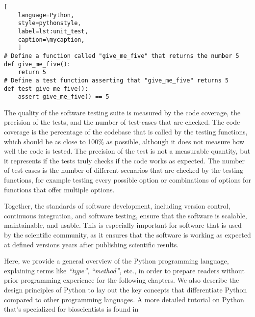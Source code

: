 \def\mycaption{ Example of an arbitrary Python function and its respective unit
    test function. The first function simply returns the number 5. The second
    function tests if the first function indeed returns the number 5. The test
    function is named with the prefix ``\texttt{test\_}'' and is placed in a
    file that ends with the suffix ``\texttt{\_test.py}''. Testing frameworks
    such as \texttt{pytest} scan the repository for files that end with
    ``\texttt{\_test.py}'' and execute the functions that start with
    ``\texttt{test\_}''. Note that code after ``\texttt{\#}'' is considered a
    comment and won't be executed.}
\begin{lstlisting}[
    language=Python, 
    style=pythonstyle,
    label=lst:unit_test, 
    caption=\mycaption,
    ]
# Define a function called "give_me_five" that returns the number 5
def give_me_five():
    return 5
# Define a test function asserting that "give_me_five" returns 5
def test_give_me_five():
    assert give_me_five() == 5 
\end{lstlisting}


The quality of the software testing suite is measured by the code coverage, the
precision of the tests, and the number of test-cases that are checked. The code
coverage is the percentage of the codebase that is called by the testing
functions, which should be as close to 100\% as possible, although it does not
measure how well the code is tested. The precision of the test is not a
measurable quantity, but it represents if the tests truly checks if the code
works as expected. The number of test-cases is the number of different scenarios
that are checked by the testing functions, for example testing every possible
option or combinations of options for functions that offer multiple options.

Together, the standards of software development, including version control,
continuous integration, and software testing, ensure that the software is
scalable, maintainable, and usable. This is especially important for software
that is used by the scientific community, as it ensures that the software is
working as expected at defined versions years after publishing scientific
results.

%
\label{sec:intro_python}%
Here, we provide a general overview of the Python programming language,
explaining terms like \textit{``type''}, \textit{``method''}, etc., in order to
prepare readers without prior programming experience for the following chapters.
We also describe the design principles of Python to lay out the key concepts
that differentiate Python compared to other programming languages. A more
detailed tutorial on Python that's specialized for bioscientists is found
in~\citealt{ekmekciIntroductionProgrammingBioscientists2016}


